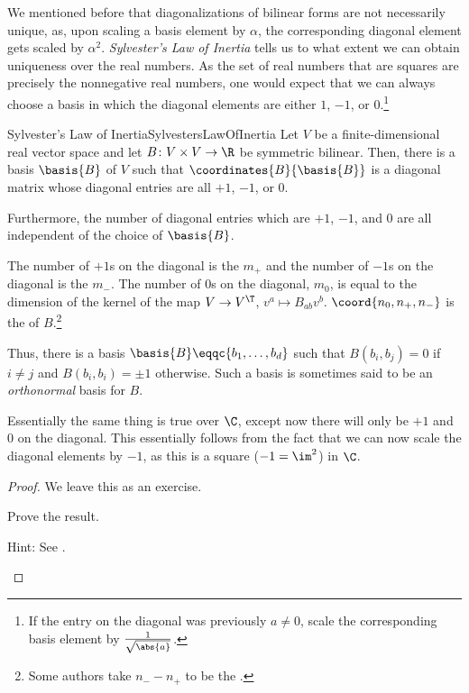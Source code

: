 We mentioned before that diagonalizations of bilinear forms are not necessarily unique, as, upon scaling a basis element by $\alpha$, the corresponding diagonal element gets scaled by $\alpha ^2$.  \emph{Sylvester's Law of Inertia} tells us to what extent we can obtain uniqueness over the real numbers.  As the set of real numbers that are squares are precisely the nonnegative real numbers, one would expect that we can always choose a basis in which the diagonal elements are either $1$, $-1$, or $0$.\footnote{If the entry on the diagonal was previously $a\neq 0$, scale the corresponding basis element by $\frac{1}{\sqrt{\abs{a}}}$.}
\begin{thm}{Sylvester's Law of Inertia}{SylvestersLawOfInertia}
	Let $V$ be a finite-dimensional real vector space and let $B\colon V\times V\rightarrow \R$ be symmetric bilinear.  Then, there is a basis $\basis{B}$ of $V$ such that $\coordinates{B}{\basis{B}}$ is a diagonal matrix whose diagonal entries are all $+1$, $-1$, or $0$.
	
	Furthermore, the number of diagonal entries which are $+1$, $-1$, and $0$ are all independent of the choice of $\basis{B}$.
	\begin{rmk}
		The number of $+1$s on the diagonal is the  $m_+$ and the number of $-1$s on the diagonal is the  $m_-$.  The number of $0$s on the diagonal, $m_0$, is equal to the dimension of the kernel of the map $V\rightarrow V^{\T}$, $v^a\mapsto B_{ab}v^b$.  $\coord{n_0,n_+,n_-}$ is the  of $B$.\footnote{Some authors take $n_--n_+$ to be the .}
	\end{rmk}
	\begin{rmk}
		Thus, there is a basis $\basis{B}\eqqc \{ b_1,\ldots ,b_d\}$ such that $B(b_i,b_j)=0$ if $i\neq j$ and $B(b_i,b_i)=\pm 1$ otherwise.  Such a basis is sometimes said to be an \emph{orthonormal} basis for $B$.
	\end{rmk}
	\begin{rmk}
		Essentially the same thing is true over $\C$, except now there will only be $+1$ and $0$ on the diagonal.  This essentially follows from the fact that we can now scale the diagonal elements by $-1$, as this is a square ($-1=\im ^2$) in $\C$.
	\end{rmk}
	\begin{proof}
		We leave this as an exercise.
		\begin{exr}[breakable=false]{}{}
			Prove the result.
			\begin{rmk}
				Hint:  See \cite[Theorem 6.38]{Friedberg}.
			\end{rmk}
		\end{exr}
	\end{proof}
\end{thm}